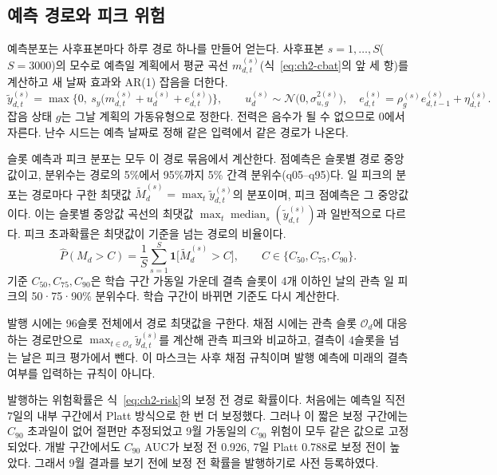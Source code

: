 \subsection{예측 경로와 피크 위험}
\label{sec:ch2-paths}

예측분포는 사후표본마다 하루 경로 하나를 만들어 얻는다. 사후표본 $s=1,\dots,S$($S=3000$)의 모수로 예측일 계획에서 평균 곡선 $m^{(s)}_{d,t}$(식~\ref{eq:ch2-cbat}의 앞 세 항)를 계산하고 새 날짜 효과와 AR(1) 잡음을 더한다.
\begin{equation}
\tilde y^{(s)}_{d,t} = \max\!\Big\{0,\ s_y\big(m^{(s)}_{d,t} + u^{(s)}_d + e^{(s)}_{d,t}\big)\Big\},
\qquad u^{(s)}_d\sim\mathcal N\big(0,\sigma^{2(s)}_{u,g}\big),\quad
e^{(s)}_{d,t}=\rho^{(s)}_g e^{(s)}_{d,t-1}+\eta^{(s)}_{d,t}.
\label{eq:ch2-path}
\end{equation}
잡음 상태 $g$는 그날 계획의 가동유형으로 정한다. 전력은 음수가 될 수 없으므로 0에서 자른다. 난수 시드는 예측 날짜로 정해 같은 입력에서 같은 경로가 나온다.

슬롯 예측과 피크 분포는 모두 이 경로 묶음에서 계산한다. 점예측은 슬롯별 경로 중앙값이고, 분위수는 경로의 5\%에서 95\%까지 5\% 간격 분위수(q05--q95)다. 일 피크의 분포는 경로마다 구한 최댓값 $\tilde M^{(s)}_d=\max_t \tilde y^{(s)}_{d,t}$의 분포이며, 피크 점예측은 그 중앙값이다. 이는 슬롯별 중앙값 곡선의 최댓값 $\max_t\operatorname{median}_s(\tilde y^{(s)}_{d,t})$과 일반적으로 다르다. 피크 초과확률은 최댓값이 기준을 넘는 경로의 비율이다.
\begin{equation}
\hat P(M_d > C) = \frac1S\sum_{s=1}^{S}\mathbf 1\big[\tilde M^{(s)}_d > C\big],
\qquad C\in\{C_{50},C_{75},C_{90}\}.
\label{eq:ch2-risk}
\end{equation}
기준 $C_{50},C_{75},C_{90}$은 학습 구간 가동일 가운데 결측 슬롯이 4개 이하인 날의 관측 일 피크의 50·75·90\% 분위수다. 학습 구간이 바뀌면 기준도 다시 계산한다.

발행 시에는 96슬롯 전체에서 경로 최댓값을 구한다. 채점 시에는 관측 슬롯 $\mathcal O_d$에 대응하는 경로만으로 $\max_{t\in\mathcal O_d}\tilde y^{(s)}_{d,t}$를 계산해 관측 피크와 비교하고, 결측이 4슬롯을 넘는 날은 피크 평가에서 뺀다. 이 마스크는 사후 채점 규칙이며 발행 예측에 미래의 결측 여부를 입력하는 규칙이 아니다.

발행하는 위험확률은 식~\eqref{eq:ch2-risk}의 보정 전 경로 확률이다. 처음에는 예측일 직전 7일의 내부 구간에서 Platt 방식으로 한 번 더 보정했다. 그러나 이 짧은 보정 구간에는 $C_{90}$ 초과일이 없어 절편만 추정되었고 9월 가동일의 $C_{90}$ 위험이 모두 같은 값으로 고정되었다. 개발 구간에서도 $C_{90}$ AUC가 보정 전 0.926, 7일 Platt 0.788로 보정 전이 높았다. 그래서 9월 결과를 보기 전에 보정 전 확률을 발행하기로 사전 등록하였다.

